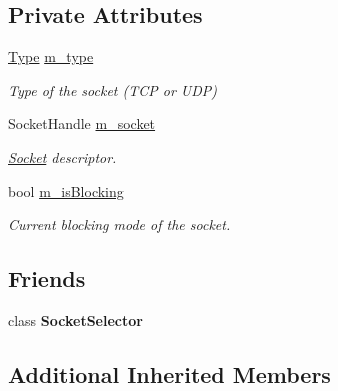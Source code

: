 \subsection*{Private Attributes}
\begin{DoxyCompactItemize}
\item 
\mbox{\label{classsf_1_1_socket_a0c41f91229069c06859746a458731617}} 
\mbox{\hyperlink{classsf_1_1_socket_a5d3ff44e56e68f02816bb0fabc34adf8}{Type}} \mbox{\hyperlink{classsf_1_1_socket_a0c41f91229069c06859746a458731617}{m\+\_\+type}}
\begin{DoxyCompactList}\small\item\em Type of the socket (T\+CP or U\+DP) \end{DoxyCompactList}\item 
\mbox{\label{classsf_1_1_socket_a83b63e07a0cfdb2bb1852990afe7762d}} 
Socket\+Handle \mbox{\hyperlink{classsf_1_1_socket_a83b63e07a0cfdb2bb1852990afe7762d}{m\+\_\+socket}}
\begin{DoxyCompactList}\small\item\em \mbox{\hyperlink{classsf_1_1_socket}{Socket}} descriptor. \end{DoxyCompactList}\item 
\mbox{\label{classsf_1_1_socket_a0eed7647c471354050aef148bf43081f}} 
bool \mbox{\hyperlink{classsf_1_1_socket_a0eed7647c471354050aef148bf43081f}{m\+\_\+is\+Blocking}}
\begin{DoxyCompactList}\small\item\em Current blocking mode of the socket. \end{DoxyCompactList}\end{DoxyCompactItemize}
\subsection*{Friends}
\begin{DoxyCompactItemize}
\item 
\mbox{\label{classsf_1_1_socket_a23fafd48278ea4f8f9c25f1f0f43693c}} 
class {\bfseries Socket\+Selector}
\end{DoxyCompactItemize}
\subsection*{Additional Inherited Members}


